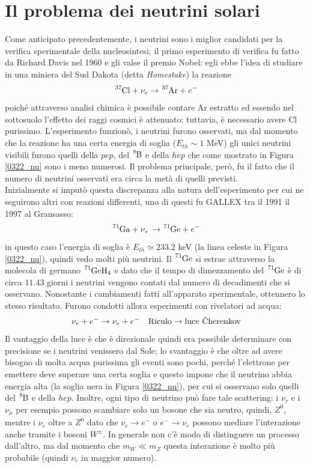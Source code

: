 \section{Il problema dei neutrini solari}\label{0322-sec-nu}
Come anticipato precedentemente, i neutrini sono i miglior candidati per la verifica sperimentale della nucleosintesi; il primo esperimento di verifica fu fatto da Richard Davis nel 1960 e gli valse il premio Nobel: egli ebbe l'idea di studiare in una miniera del Sud Dakota (detta \textit{Homestake}) la reazione
$$\ce{^{37}Cl} + \nu_e \to \ce{^{37}Ar} + e^-$$
poiché attraverso analisi chimica è possibile contare Ar estratto ed essendo nel sottosuolo l'effetto dei raggi cosmici è attenuato; tuttavia, è necessario avere Cl purissimo. L'esperimento funzionò, i neutrini furono osservati, ma dal momento che la reazione ha una certa energia di soglia ($E_{th}\sim 1$ MeV) gli unici neutrini visibili furono quelli della $pep$, del $\ce{^8B}$ e della $hep$ che come mostrato in Figura \ref{0322_nu} sono i meno numerosi. Il problema principale, però, fu il fatto che il numero di neutrini osservati era circa la metà di quelli previsti.\\
Inizialmente si imputò questa discrepanza alla natura dell'esperimento per cui ne seguirono altri con reazioni differenti, uno di questi fu GALLEX tra il 1991  il 1997 al Gransasso:
$$\ce{^{71}Ga + \nu_e \to \ce{^{71}Ge}} +e^-$$
in questo caso l'energia di soglia è $E_{th}\simeq 233.2$ keV (la linea celeste in Figura \ref{0322_nu}), quindi vedo molti più neutrini. Il $\ce{^{71}Ge}$ si estrae attraverso la molecola di germano $\ce{^{71}GeH_4}$ e dato che il tempo di dimezzamento del $\ce{^{71}Ge}$ è di circa $11.43$ giorni i neutrini vengono contati dal numero di decadimenti che si osservano. Nonostante i cambiamenti fatti all'apparato sperimentale, ottennero lo stesso risultato. Furono condotti allora esperimenti con rivelatori \cherenkov{} ad acqua:
$$\nu_e + e^- \to \nu_e + e^- \quad \text{Riculo} \to \text{luce \cherenkov}$$
Il vantaggio della luce \cherenkov{} è che è direzionale quindi era possibile determinare con precisione se i neutrini venissero dal Sole; lo svantaggio è che oltre ad avere bisogno di molta acqua purissima gli eventi sono pochi, perché l'elettrone per emettere deve superare una certa soglia e questo impone che il neutrino abbia energia alta (la soglia nera in Figura \ref{0322_nu}), per cui si osservano solo quelli del $\ce{^8B}$ e della $hep$. Inoltre, ogni tipo di neutrino può fare tale scattering: i $\nu_\tau$ e i $\nu_\mu$ per esempio possono scambiare solo un bosone che sia neutro, quindi, $Z^0$, mentre i $\nu_e$ oltre a $Z^0$ dato che $\nu_e\to e^-$ o $e^-\to \nu_e$ possono mediare l'interazione anche tramite i bosoni $W^\pm$. In generale non c'è modo di distinguere un processo dall'altro, ma dal momento che $m_W\ll m_Z$ questa interazione è molto più probabile (quindi $\nu_e$ in maggior numero).
